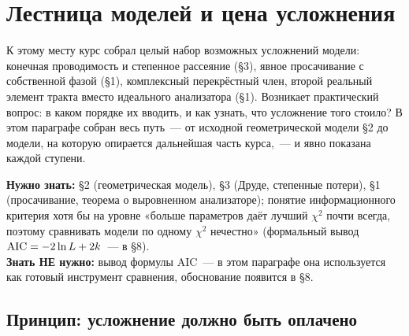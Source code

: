 %
%
\section{Лестница моделей и цена усложнения}
\label{sec:ladder}

К этому месту курс собрал целый набор возможных усложнений модели: конечная проводимость и
степенное рассеяние (§3), явное просачивание с собственной фазой (§1), комплексный перекрёстный
член, второй реальный элемент тракта вместо идеального анализатора (§1). Возникает практический
вопрос: в каком порядке их вводить, и как узнать, что усложнение того стоило? В этом параграфе
собран весь путь~--- от исходной геометрической модели §2 до модели, на которую опирается
дальнейшая часть курса,~--- и явно показана  каждой ступени.

\begin{tcolorbox}[enhanced,colback=cPanel,colframe=cGrid,boxrule=0.8pt,arc=2pt,
                  title={\bfseries\color{cAccent} Пререквизиты},coltitle=cAccent,
                  attach boxed title to top left={xshift=6pt,yshift=-2pt},
                  boxed title style={colback=cPanel,boxrule=0pt,arc=0pt},top=10pt]
\textbf{Нужно знать:} §2 (геометрическая модель), §3 (Друде, степенные потери), §1 (просачивание,
теорема о выровненном анализаторе); понятие информационного критерия хотя бы на уровне «больше
параметров даёт лучший $\chi^2$ почти всегда, поэтому сравнивать модели по одному $\chi^2$
нечестно» (формальный вывод $\operatorname{AIC}=-2\ln L+2k$~--- в §8).\\[0.3em]
\textbf{Знать НЕ нужно:} вывод формулы AIC~--- в этом параграфе она используется как готовый
инструмент сравнения, обоснование появится в §8.
\end{tcolorbox}

\subsection{Принцип: усложнение должно быть оплачено}
\label{subsec:pay-principle}

